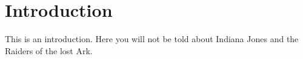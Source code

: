 \section{Introduction}
This is an introduction. Here you will not be told about Indiana Jones and the Raiders of the lost Ark.
